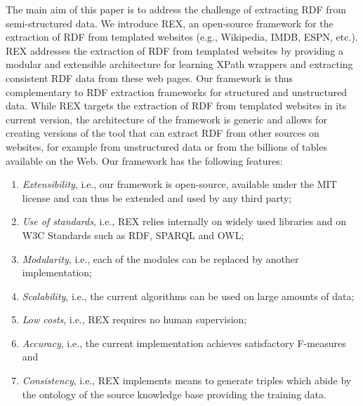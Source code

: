\documentclass{llncs}
\begin{document}
The main aim of this paper is to address the challenge of extracting RDF from semi-structured data.
We introduce REX, an open-source framework for the extraction of RDF from templated websites (e.g., Wikipedia, IMDB, ESPN, etc.).
REX addresses the extraction of RDF from templated websites by providing a modular and extensible architecture for learning XPath wrappers and extracting consistent RDF data from these web pages.
Our framework is thus complementary to RDF extraction frameworks for structured and unstructured data.
While REX targets the extraction of RDF from templated websites in its current version, the architecture of the framework is generic and allows for creating versions of the tool that can extract RDF from other sources on websites, for example from unstructured data or from the billions of tables available on the Web.
Our framework has the following features:
\begin{enumerate}
\item \emph{Extensibility}, i.e., our framework is open-source, available under the MIT license and can thus be extended and used by any third party;
\item \emph{Use of standards}, i.e., REX relies internally on widely used libraries and on W3C Standards such as RDF, SPARQL and OWL;
\item \emph{Modularity}, i.e., each of the modules can be replaced by another implementation;
\item \emph{Scalability}, i.e., the current algorithms can be used on large amounts of data; 
\item \emph{Low costs}, i.e., REX requires no human supervision; 
\item \emph{Accuracy}, i.e., the current implementation achieves satisfactory F-measures 
and
\item \emph{Consistency}, i.e., REX implements means to generate triples which abide by the ontology of the source knowledge base providing the training data.
\end{enumerate}
\end{document}
